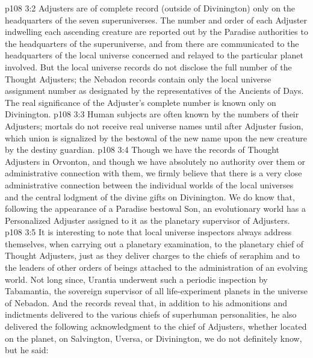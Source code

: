 \vs p108 3:2 Adjusters are of complete record (outside of Divinington) only on the headquarters of the seven superuniverses. The number and order of each Adjuster indwelling each ascending creature are reported out by the Paradise authorities to the headquarters of the superuniverse, and from there are communicated to the headquarters of the local universe concerned and relayed to the particular planet involved. But the local universe records do not disclose the full number of the Thought Adjusters; the Nebadon records contain only the local universe assignment number as designated by the representatives of the Ancients of Days. The real significance of the Adjuster’s complete number is known only on Divinington.
\vs p108 3:3 Human subjects are often known by the numbers of their Adjusters; mortals do not receive real universe names until after Adjuster fusion, which union is signalized by the bestowal of the new name upon the new creature by the destiny guardian.
\vs p108 3:4 Though we have the records of Thought Adjusters in Orvonton, and though we have absolutely no authority over them or administrative connection with them, we firmly believe that there is a very close administrative connection between the individual worlds of the local universes and the central lodgment of the divine gifts on Divinington. We do know that, following the appearance of a Paradise bestowal Son, an evolutionary world has a Personalized Adjuster assigned to it as the planetary supervisor of Adjusters.
\vs p108 3:5 \pc It is interesting to note that local universe inspectors always address themselves, when carrying out a planetary examination, to the planetary chief of Thought Adjusters, just as they deliver charges to the chiefs of seraphim and to the leaders of other orders of beings attached to the administration of an evolving world. Not long since, Urantia underwent such a periodic inspection by Tabamantia, the sovereign supervisor of all life\hyp{}experiment planets in the universe of Nebadon. And the records reveal that, in addition to his admonitions and indictments delivered to the various chiefs of superhuman personalities, he also delivered the following acknowledgment to the chief of Adjusters, whether located on the planet, on Salvington, Uversa, or Divinington, we do not definitely know, but he said:
